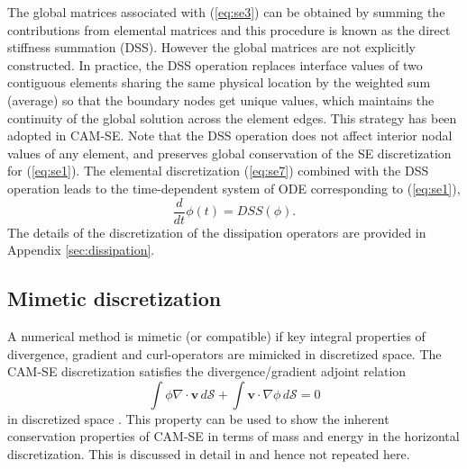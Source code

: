 \documentclass{agujournal}
\begin{document}
  The  global matrices associated with  (\ref{eq:se3}) can be obtained 
  by  summing the contributions from elemental matrices  and  this procedure is known as the 
  direct stiffness summation (DSS). However the global matrices are  not explicitly constructed. 
  In practice, the DSS operation replaces  interface values  of two  contiguous elements sharing the same physical location  
  by the  weighted sum (average)  so that  the boundary  nodes get unique values,   
   which maintains the continuity of the global solution across the element edges. This strategy has been adopted in CAM-SE. 
  Note that the DSS operation does not affect interior nodal values of any element, and  preserves global conservation of the SE discretization
  for (\ref{eq:se1}).  The elemental discretization (\ref{eq:se7}) combined with the  DSS operation  leads 
  to the time-dependent  system of ODE corresponding to (\ref{eq:se1}),
     \begin{equation}
  \frac{d }{dt} \phi(t) =   DSS(\phi).  \label{eq:se8}
       \end{equation}
The details of the discretization of the dissipation operators are provided in Appendix \ref{sec:dissipation}.

{}

%
\subsection{Mimetic discretization}
A numerical method is mimetic (or compatible) if key integral properties of divergence, gradient and curl-operators are mimicked in discretized space. The CAM-SE discretization satisfies the divergence/gradient adjoint relation
\begin{equation}
\int \phi \nabla \cdot \mathbf{v} \, d\mathcal{S}+\int \mathbf{v} \cdot \nabla \phi \, d\mathcal{S}=0
\end{equation}
in  discretized space \citep{TF2010JCP}. This property can be used to show the inherent conservation properties of CAM-SE in terms of mass and energy in the horizontal discretization. This is discussed in detail in \cite{T2011LNCSEb} and hence not repeated here. 
\end{document}
